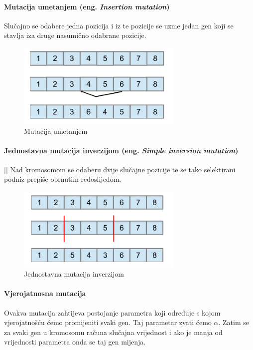 \documentclass[times, utf8, zavrsni]{fer}
\begin{document}
\paragraph{Mutacija umetanjem (eng. \emph{Insertion mutation})}

Slučajno se odabere jedna pozicija i iz te pozicije se uzme jedan gen koji se stavlja iza druge nasumično odabrane pozicije. 


\begin{figure}[!htb]
	\centering
	\includegraphics[width=8cm]{slike/ISM.png}
	\caption{Mutacija umetanjem}
	\label{fig:insertion-mutation}
\end{figure}

\paragraph{Jednostavna mutacija inverzijom (eng. \emph{Simple inversion mutation})}[\citep{Holland}]
Nad kromosomom se odaberu dvije slučajne pozicije te se tako selektirani podniz prepiše obrnutim redoslijedom.


\begin{figure}[!htb]
	\centering
	\includegraphics[width=8cm]{slike/SIM.png}
	\caption{Jednostavna mutacija inverzijom}
	\label{fig:inversion-mutation}
\end{figure}

\paragraph{Vjerojatnosna mutacija}

Ovakva mutacija zahtijeva postojanje parametra koji određuje s kojom vjerojatnošću ćemo promijeniti svaki gen. Taj parametar zvati ćemo $\alpha$. Zatim se za svaki gen u kromosomu računa slučajna vrijednost i ako je manja od vrijednosti parametra onda se taj gen mijenja.
\end{document}
